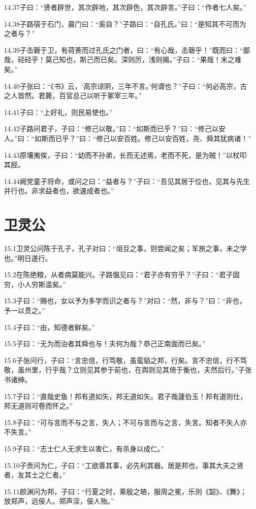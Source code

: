 \documentclass[a4paper,12pt,UTF8,twoside]{ctexbook}
\begin{document}
14.37子曰：“贤者辟世，其次辟地，其次辟色，其次辟言。”子曰：“作者七人矣。”

14.38子路宿于石门，晨门曰：“奚自？”子路曰：“自孔氏。”曰：“是知其不可而为之者与？”

14.39子击磬于卫，有荷蒉而过孔氏之门者，曰：“有心哉，击磬乎！”既而曰：“鄙哉，硁硁乎！莫己知也，斯己而已矣。深则厉，浅则揭。”子曰：“果哉！末之难矣。”

14.40子张曰：“《书》云，‘高宗谅阴，三年不言。’何谓也？”子曰：“何必高宗，古之人皆然。君薨，百官总己以听于冢宰三年。”

14.41子曰：“上好礼，则民易使也。”

14.42子路问君子，子曰：“修己以敬。”曰：“如斯而已乎？”曰：“修己以安人。”曰：“如斯而已乎？”曰：“修己以安百姓。修己以安百姓，尧、舜其犹病诸！”

14.43原壤夷俟，子曰：“幼而不孙弟，长而无述焉，老而不死，是为贼！”以杖叩其胫。

14.44阙党童子将命，或问之曰：“益者与？”子曰：“吾见其居于位也，见其与先生并行也。非求益者也，欲速成者也。”

\chapter{卫灵公}
15.1卫灵公问陈于孔子，孔子对曰：“俎豆之事，则尝闻之矣；军旅之事，未之学也。”明日遂行。

15.2在陈绝粮，从者病莫能兴。子路愠见曰：“君子亦有穷乎？”子曰：“君子固穷，小人穷斯滥矣。”

15.3子曰：“赐也，女以予为多学而识之者与？”对曰：“然，非与？”曰：“非也，予一以贯之。”

15.4子曰：“由，知德者鲜矣。”

15.5子曰：“无为而治者其舜也与！夫何为哉？恭己正南面而已矣。”

15.6子张问行，子曰：“言忠信，行笃敬，虽蛮貊之邦，行矣。言不忠信，行不笃敬，虽州里，行乎哉？立则见其参于前也，在舆则见其倚于衡也，夫然后行。”子张书诸绅。

15.7子曰：“直哉史鱼！邦有道如矢，邦无道如矢。君子哉蘧伯玉！邦有道则仕，邦无道则可卷而怀之。”

15.8子曰：“可与言而不与之言，失人；不可与言而与之言，失言。知者不失人亦不失言。”

15.9子曰：“志士仁人无求生以害仁，有杀身以成仁。”

15.10子贡问为仁，子曰：“工欲善其事，必先利其器。居是邦也，事其大夫之贤者，友其士之仁者。”

15.11颜渊问为邦，子曰：“行夏之时，乘殷之辂，服周之冕，乐则《韶》、《舞》；放郑声，远佞人。郑声淫，佞人殆。”
\end{document}
